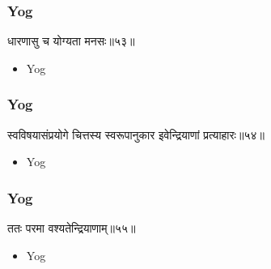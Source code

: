 \begin{frame}[fragile]\frametitle{Yog}
\begin{sanskrit}
धारणासु च योग्यता मनसः॥५३॥
\end{sanskrit}
	\begin{itemize}
	\item Yog 
	\end{itemize}
\end{frame}

\begin{frame}[fragile]\frametitle{Yog}
\begin{sanskrit}
स्वविषयासंप्रयोगे चित्तस्य स्वरूपानुकार इवेन्द्रियाणां प्रत्याहारः॥५४॥
\end{sanskrit}
	\begin{itemize}
	\item Yog 
	\end{itemize}
\end{frame}

\begin{frame}[fragile]\frametitle{Yog}
\begin{sanskrit}
ततः परमा वश्यतेन्द्रियाणाम्॥५५॥
\end{sanskrit}
	\begin{itemize}
	\item Yog 
	\end{itemize}
\end{frame}

